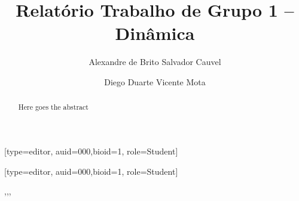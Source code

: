 \documentclass[a4paper,fleqn]{cas-sc}
\begin{document}
\let\WriteBookmarks\relax
\def\floatpagepagefraction{1}
\def\textpagefraction{.001}

\shorttitle{}    

\shortauthors{}  

\title [mode = title]{Relatório Trabalho de Grupo 1 -- Dinâmica}  

\tnotemark[1] 


%
\author[1]{Alexandre de Brito Salvador Cauvel}[type=editor,
                        auid=000,bioid=1,
                        role=Student]

\cormark[1]
\fnmark[1]


\author[1]{Diego Duarte Vicente Mota}[type=editor,
                        auid=000,bioid=1,
                        role=Student]
\fnmark[2]






\begin{abstract}
Here goes the abstract \nocite{*}%
\end{abstract}



\begin{keywords}
 \sep \sep \sep
\end{keywords}

\maketitle
\end{document}
